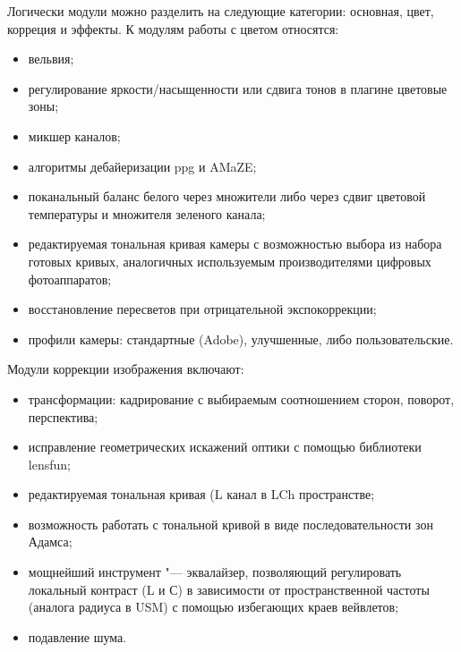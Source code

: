 \documentclass[10pt, a5paper]{article}
\begin{document}
\begin{figure}[ht]
\end{figure}
Логически модули можно разделить на следующие категории: основная, цвет, корреция и эффекты.
К модулям работы с цветом относятся:
\begin{itemize}
\item вельвия;
\item регулирование яркости/насыщенности или сдвига тонов в плагине цветовые зоны;
\item микшер каналов;
\item алгоритмы дебайеризации ppg и AMaZE;
\item поканальный баланс белого через множители либо через сдвиг цветовой температуры и множителя зеленого канала;
\item редактируемая тональная кривая камеры с возможностью выбора из набора готовых кривых, аналогичных используемым производителями цифровых фотоаппаратов;
\item восстановление пересветов при отрицательной экспокоррекции;
\item профили камеры: стандартные (Adobe), улучшенные, либо пользовательские.
\end{itemize}
Модули коррекции изображения включают:
\begin{itemize}
\item трансформации: кадрирование с выбираемым соотношением сторон, поворот, перспектива;
\item исправление геометрических искажений оптики с помощью библиотеки lensfun;
\item редактируемая тональная кривая (L канал в LCh пространстве;
\item возможность работать с тональной кривой в виде последовательности зон Адамса;
\item мощнейший инструмент "--- эквалайзер, позволяющий регулировать локальный контраст (L и С) в зависимости от пространственной частоты (аналога радиуса в USM) с помощью избегающих краев вейвлетов;
\item подавление шума.
\end{itemize}
\end{document}
